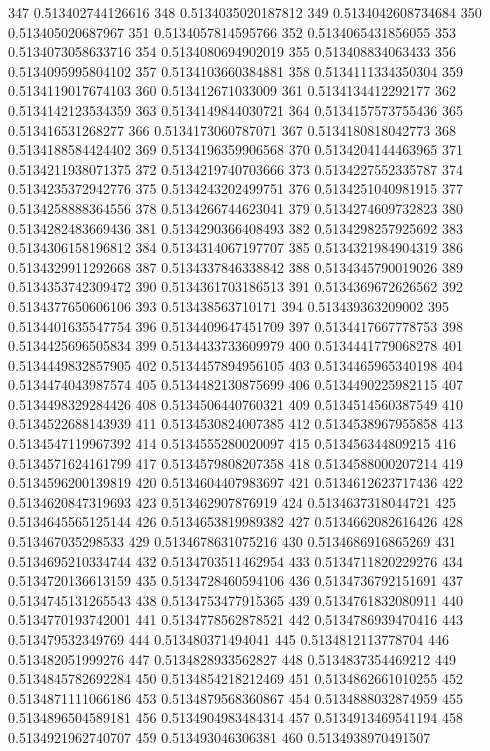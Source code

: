 347 0.513402744126616
348 0.5134035020187812
349 0.5134042608734684
350 0.513405020687967
351 0.5134057814595766
352 0.5134065431856055
353 0.5134073058633716
354 0.5134080694902019
355 0.513408834063433
356 0.5134095995804102
357 0.5134103660384881
358 0.5134111334350304
359 0.5134119017674103
360 0.513412671033009
361 0.5134134412292177
362 0.5134142123534359
363 0.5134149844030721
364 0.5134157573755436
365 0.513416531268277
366 0.5134173060787071
367 0.5134180818042773
368 0.5134188584424402
369 0.5134196359906568
370 0.5134204144463965
371 0.5134211938071375
372 0.5134219740703666
373 0.5134227552335787
374 0.5134235372942776
375 0.5134243202499751
376 0.5134251040981915
377 0.5134258888364556
378 0.5134266744623041
379 0.5134274609732823
380 0.5134282483669436
381 0.5134290366408493
382 0.5134298257925692
383 0.5134306158196812
384 0.5134314067197707
385 0.5134321984904319
386 0.5134329911292668
387 0.5134337846338842
388 0.5134345790019026
389 0.5134353742309472
390 0.5134361703186513
391 0.5134369672626562
392 0.5134377650606106
393 0.513438563710171
394 0.513439363209002
395 0.5134401635547754
396 0.5134409647451709
397 0.5134417667778753
398 0.5134425696505834
399 0.5134433733609979
400 0.5134441779068278
401 0.5134449832857905
402 0.5134457894956105
403 0.5134465965340198
404 0.5134474043987574
405 0.5134482130875699
406 0.5134490225982115
407 0.5134498329284426
408 0.5134506440760321
409 0.5134514560387549
410 0.5134522688143939
411 0.5134530824007385
412 0.5134538967955858
413 0.5134547119967392
414 0.5134555280020097
415 0.513456344809215
416 0.5134571624161799
417 0.5134579808207358
418 0.5134588000207214
419 0.5134596200139819
420 0.5134604407983697
421 0.5134612623717436
422 0.5134620847319693
423 0.513462907876919
424 0.5134637318044721
425 0.5134645565125144
426 0.5134653819989382
427 0.5134662082616426
428 0.513467035298533
429 0.5134678631075216
430 0.5134686916865269
431 0.5134695210334744
432 0.5134703511462954
433 0.5134711820229276
434 0.5134720136613159
435 0.5134728460594106
436 0.5134736792151691
437 0.5134745131265543
438 0.5134753477915365
439 0.5134761832080911
440 0.5134770193742001
441 0.5134778562878521
442 0.5134786939470416
443 0.513479532349769
444 0.513480371494041
445 0.5134812113778704
446 0.513482051999276
447 0.5134828933562827
448 0.5134837354469212
449 0.5134845782692284
450 0.5134854218212469
451 0.5134862661010255
452 0.5134871111066186
453 0.5134879568360867
454 0.5134888032874959
455 0.5134896504589181
456 0.5134904983484314
457 0.5134913469541194
458 0.5134921962740707
459 0.513493046306381
460 0.5134938970491507
